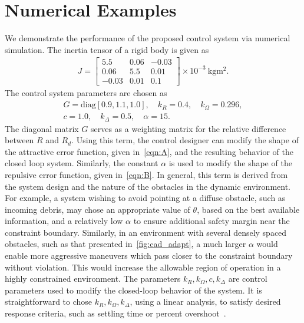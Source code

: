 \section{Numerical Examples}\label{sec:numerical_simulation}

We demonstrate the performance of the proposed control system via numerical simulation.
The inertia tensor of a rigid body is given as
\begin{gather*}
    J = \begin{bmatrix}
	\num{5.5} & \num{0.06} & \num{-0.03} \\
	\num{0.06} & \num{5.5} & \num{0.01} \\
	\num{-0.03} & \num{0.01} & \num{0.1}
    \end{bmatrix} \times 10^{-3}~\si{\kilo\gram\meter\squared} .
\end{gather*} 
The control system parameters are chosen as
\begin{gather*}
	G = \text{diag} [0.9,1.1,1.0], \quad k_R = 0.4 , \quad	k_\Omega = 0.296 ,\\
	c = 1.0 , \quad k_\Delta = 0.5 , \quad \alpha = 15 .
\end{gather*}
The diagonal matrix \( G \) serves as a weighting matrix for the relative difference between \( R \) and \( R_d \). 
Using this term, the control designer can modify the shape of the attractive error function, given in~\cref{eqn:A}, and the resulting behavior of the closed loop system.
Similarly, the constant \( \alpha \) is used to modify the shape of the repulsive error function, given in~\cref{eqn:B}.
In general, this term is derived from the system design and the nature of the obstacles in the dynamic environment.
For example, a system wishing to avoid pointing at a diffuse obstacle, such as incoming debris, may chose an appropriate value of \( \theta \), based on the best available information, and a relatively low \( \alpha \) to ensure additional safety margin near the constraint boundary. 
Similarly, in an environment with several densely spaced obstacles, such as that presented in~\cref{fig:cad_adapt}, a much larger \( \alpha \) would enable more aggressive maneuvers which pass closer to the constraint boundary without violation.
This would increase the allowable region of operation in a highly constrained environment.
The parameters \( k_R, k_\Omega, c, k_\Delta\) are control parameters used to modify the closed-loop behavior of the system.
It is straightforward to chose \( k_R, k_\Omega, k_\Delta\), using a linear analysis, to satisfy desired response criteria, such as settling time or percent overshoot~\cite{nise2004}.
